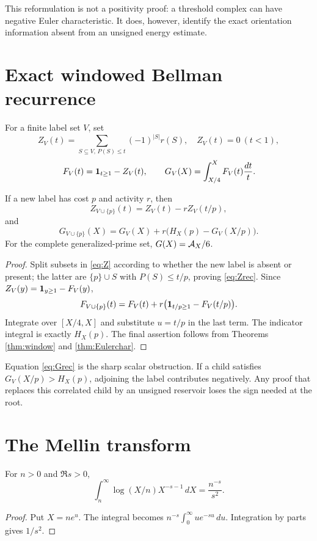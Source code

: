 This reformulation is not a positivity proof: a threshold complex can have
negative Euler characteristic.  It does, however, identify the exact
orientation information absent from an unsigned energy estimate.

\section{Exact windowed Bellman recurrence}

For a finite label set $V$, set
\[
 Z_V(t)=\sum_{S\subseteq V,\,P(S)\le t}(-1)^{|S|}r(S),
 \quad Z_V(t)=0\ (t<1),
\]
\[
 F_V(t)=\mathbf 1_{t\ge1}-Z_V(t),
 \qquad G_V(X)=\int_{X/4}^{X}F_V(t)\frac{dt}{t}.
\]

\begin{theorem}\label{thm:Bellman}
If a new label has cost $p$ and activity $r$, then
\begin{equation}\label{eq:Zrec}
 Z_{V\cup\{p\}}(t)=Z_V(t)-rZ_V(t/p),
\end{equation}
and
\begin{equation}\label{eq:Grec}
 \boxed{G_{V\cup\{p\}}(X)
 =G_V(X)+r\bigl(H_X(p)-G_V(X/p)\bigr)}.
\end{equation}
For the complete generalized-prime set, $G(X)=\mathcal A_X/6$.
\end{theorem}
\begin{proof}
Split subsets in \eqref{eq:Z} according to whether the new label is absent or
present; the latter are $\{p\}\cup S$ with $P(S)\le t/p$, proving
\eqref{eq:Zrec}.  Since
$Z_V(y)=\mathbf 1_{y\ge1}-F_V(y)$,
\[
 F_{V\cup\{p\}}(t)=F_V(t)+r\bigl(\mathbf 1_{t/p\ge1}-F_V(t/p)\bigr).
\]
Integrate over $[X/4,X]$ and substitute $u=t/p$ in the last term.  The
indicator integral is exactly $H_X(p)$.  The final assertion follows from
Theorems \ref{thm:window} and \ref{thm:Eulerchar}.
\end{proof}

Equation \eqref{eq:Grec} is the sharp scalar obstruction.  If a child satisfies
$G_V(X/p)>H_X(p)$, adjoining the label contributes negatively.  Any proof that
replaces this correlated child by an unsigned reservoir loses the sign needed
at the root.

\section{The Mellin transform}

\begin{lemma}\label{lem:logMellin}
For $n>0$ and $\Re s>0$,
\[
 \int_n^\infty \log(X/n)X^{-s-1}\,dX=\frac{n^{-s}}{s^2}.
\]
\end{lemma}
\begin{proof}
Put $X=ne^u$.  The integral becomes
$n^{-s}\int_0^\infty ue^{-su}\,du$.  Integration by parts gives $1/s^2$.
\end{proof}

